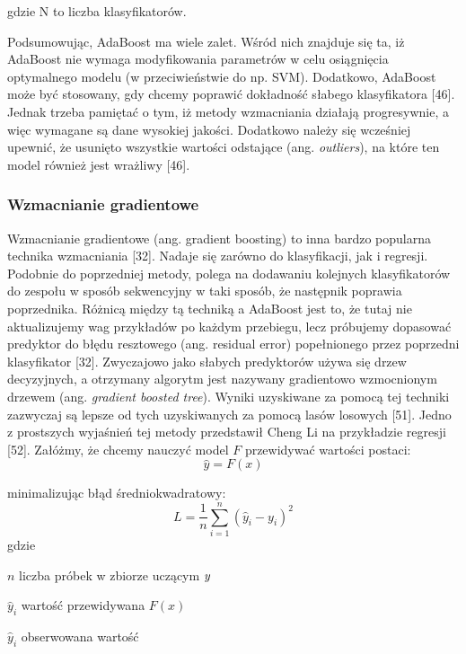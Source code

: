 \noindent gdzie N to liczba klasyfikatorów. 

Podsumowując, AdaBoost ma wiele zalet. Wśród nich znajduje się ta, iż AdaBoost nie wymaga modyfikowania parametrów w celu osiągnięcia optymalnego modelu (w przeciwieństwie do np. SVM). Dodatkowo, AdaBoost może być stosowany, gdy chcemy poprawić dokładność słabego klasyfikatora [46]. Jednak trzeba pamiętać o tym, iż metody wzmacniania działają progresywnie, a więc wymagane są dane wysokiej jakości. Dodatkowo należy się wcześniej upewnić, że usunięto wszystkie wartości odstające (ang. \textit{outliers}), na które ten model również jest wrażliwy [46]. 

\subsubsection{Wzmacnianie gradientowe}
\label{cha:Wzmacnianie gradientowe}

Wzmacnianie gradientowe (ang. gradient boosting) to inna bardzo popularna technika wzmacniania [32]. Nadaje się zarówno do klasyfikacji, jak i regresji. Podobnie do poprzedniej metody, polega na dodawaniu kolejnych klasyfikatorów do zespołu w sposób sekwencyjny w taki sposób, że następnik poprawia poprzednika. Różnicą między tą techniką a AdaBoost jest to, że tutaj nie aktualizujemy wag przykładów po każdym przebiegu, lecz próbujemy dopasować predyktor do błędu resztowego (ang. residual error) popełnionego przez poprzedni klasyfikator [32]. Zwyczajowo jako słabych predyktorów używa się drzew decyzyjnych, a otrzymany algorytm jest nazywany gradientowo wzmocnionym drzewem (ang. \textit{gradient boosted tree}). Wyniki uzyskiwane za pomocą tej techniki zazwyczaj są lepsze od tych uzyskiwanych za pomocą lasów losowych [51]. Jedno z prostszych wyjaśnień tej metody przedstawił Cheng Li na przykładzie regresji [52]. Załóżmy, że chcemy nauczyć model $F$ przewidywać wartości postaci:
\begin{equation}
\hat y = F(x)
\end{equation}

\noindent minimalizując błąd średniokwadratowy:
\begin{equation}
L=\frac 1 n \sum_{i=1}^n(\hat y_i-y_i)^2
\end{equation}
gdzie
\begin{eqwhere}[2cm]
	\item [$n$] liczba próbek w zbiorze uczącym $\hbox{\it y}$
	\item [$\hat y_i$] wartość przewidywana $F(x)$
	\item [$\hat y_i$] obserwowana wartość
\end{eqwhere}

